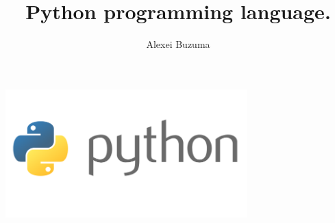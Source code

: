 \documentclass[14pt, a4paper]{article}
\title{Python programming language.}
\author{Alexei Buzuma}
\begin{document}
	\maketitle
	
	\begin{center}
		\includegraphics[width=0.7\textwidth]{n.png}
	\end{center}
	\newpage
\end{document}
